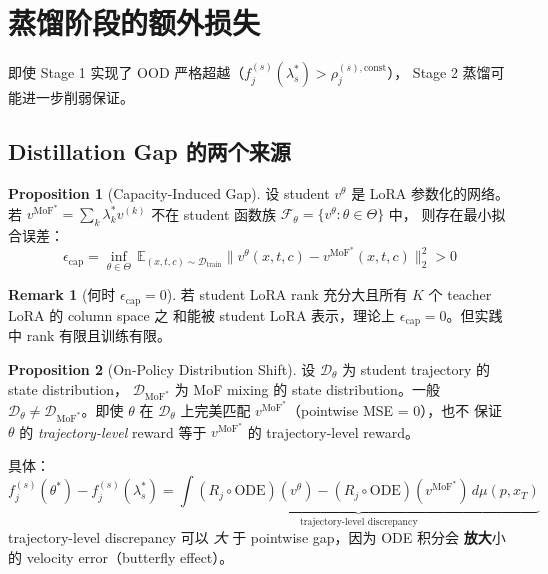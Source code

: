 \documentclass[11pt,a4paper]{article}
\newcommand{\E}{\mathbb{E}}
\newcommand{\MoF}{\mathrm{MoF}}
\newcommand{\const}{\mathrm{const}}
\theoremstyle{definition}
\newtheorem{remark}{Remark}
\newtheorem{proposition}{Proposition}
\begin{document}
\section{蒸馏阶段的额外损失}
\label{sec:distill_gap}

即使 Stage 1 实现了 OOD 严格超越（$f_j^{(s)}(\lambda_s^*) > \rho_j^{(s),\const}$），
Stage 2 蒸馏可能进一步削弱保证。

\subsection{Distillation Gap 的两个来源}

\begin{proposition}[Capacity-Induced Gap]
\label{prop:capacity_gap}
设 student $v^\theta$ 是 LoRA 参数化的网络。若 $v^{\MoF^*} = \sum_k \lambda_k^* v^{(k)}$
不在 student 函数族 $\mathcal{F}_\theta = \{v^\theta : \theta \in \Theta\}$ 中，
则存在最小拟合误差：
\begin{equation}
\epsilon_{\text{cap}} = \inf_{\theta \in \Theta}\, \E_{(x, t, c) \sim \mathcal{D}_{\text{train}}}
\big\|v^\theta(x, t, c) - v^{\MoF^*}(x, t, c)\big\|_2^2 > 0
\label{eq:capacity_gap}
\end{equation}
\end{proposition}

\begin{remark}[何时 $\epsilon_{\text{cap}} = 0$]
若 student LoRA rank 充分大且所有 $K$ 个 teacher LoRA 的 column space 之
和能被 student LoRA 表示，理论上 $\epsilon_{\text{cap}} = 0$。但实践中 rank
有限且训练有限。
\end{remark}

\begin{proposition}[On-Policy Distribution Shift]
\label{prop:on_policy_shift}
设 $\mathcal{D}_{\theta}$ 为 student trajectory 的 state distribution，
$\mathcal{D}_{\MoF^*}$ 为 MoF mixing 的 state distribution。一般
$\mathcal{D}_{\theta} \neq \mathcal{D}_{\MoF^*}$。即使 $\theta$ 在
$\mathcal{D}_{\theta}$ 上完美匹配 $v^{\MoF^*}$（pointwise MSE = 0），也不
保证 $\theta$ 的 \emph{trajectory-level} reward 等于 $v^{\MoF^*}$ 的
trajectory-level reward。

具体：
\begin{equation}
f_j^{(s)}(\theta^*) - f_j^{(s)}(\lambda_s^*) =
\underbrace{\int (R_j \circ \mathrm{ODE})(v^\theta) - (R_j \circ \mathrm{ODE})(v^{\MoF^*})\,d\mu(p, x_T)}_{\text{trajectory-level discrepancy}}
\end{equation}
trajectory-level discrepancy 可以 \emph{大} 于 pointwise gap，因为 ODE 积分会
\textbf{放大}小的 velocity error（butterfly effect）。
\end{proposition}
\end{document}

